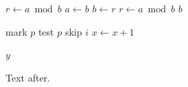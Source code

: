 \documentclass{article}
\begin{document}
\begin{algorithmic}[1]
\State $r \gets a \bmod b$
\State $a \gets b$
\State $b \gets r$
\State $r \gets a \bmod b$
\EndWhile
\State \Return $b$
\EndProcedure
\end{algorithmic}

\begin{algorithmic}
\State mark $p$
\State test $p$
\Else
{} \State skip $i$ \EndFor
\EndIf
\EndFor
\Repeat
\State $x \gets x + 1$
\end{algorithmic}

\begin{algorithmic}
\State $y$
\end{algorithmic}
Text after.
\end{document}

